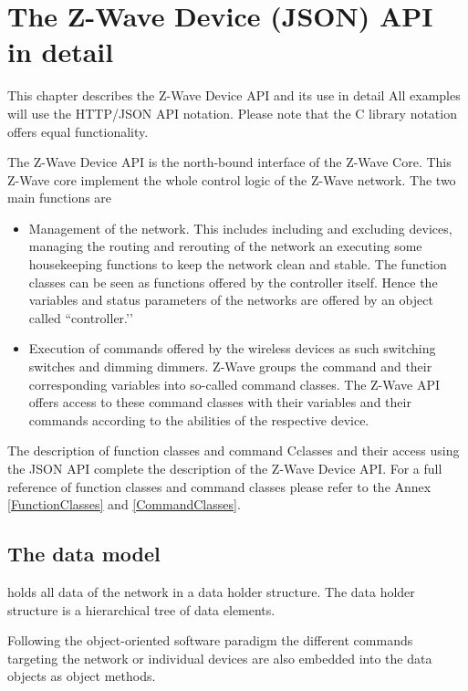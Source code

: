 \section {The Z-Wave Device (JSON) API in detail}
\label{c2}

This chapter describes the Z-Wave Device API and its use in detail All examples 
will use the HTTP/JSON API notation. Please note that the C library notation offers 
equal functionality.

The Z-Wave Device API is the north-bound interface of the Z-Wave Core. This Z-Wave 
core implement the whole control logic of the Z-Wave network. The two main functions are

\begin{itemize}
\item Management of the network. This includes including and excluding devices, managing 
the routing and rerouting of the network an executing some housekeeping functions to 
keep the network clean and stable. The function classes can be seen as functions offered 
by the controller itself. Hence the variables and status parameters of the networks are 
offered by an object called ``controller.’’

\item Execution of commands offered by the wireless devices as such switching switches 
and dimming dimmers. Z-Wave groups the command and their corresponding variables into 
so-called command classes. The Z-Wave API offers access to these command classes with 
their variables and their commands according to the abilities of the respective device.
\end{itemize}

The description of function classes and command Cclasses and their access using the JSON 
API complete the description of the Z-Wave Device API. For a full reference of function 
classes and command classes please refer to the Annex \ref{FunctionClasses} and \ref{CommandClasses}.

\subsection{The data model}
\label{datamodel}

\zway holds all data of the \zway network in a data holder structure. The data holder 
structure is a hierarchical tree of data elements.

Following the object-oriented software paradigm the different commands targeting the 
network or individual devices are also embedded into the data objects as object methods.

